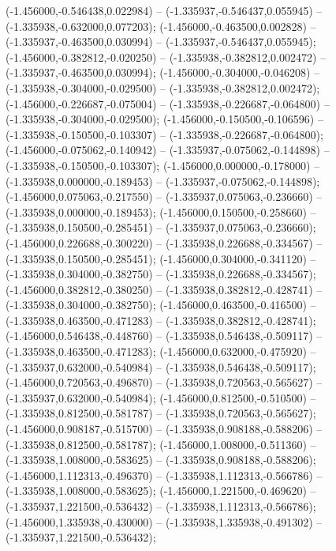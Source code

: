  (-1.456000,-0.546438,0.022984) -- (-1.335937,-0.546437,0.055945) -- (-1.335938,-0.632000,0.077203);
 (-1.456000,-0.463500,0.002828) -- (-1.335937,-0.463500,0.030994) -- (-1.335937,-0.546437,0.055945);
 (-1.456000,-0.382812,-0.020250) -- (-1.335938,-0.382812,0.002472) -- (-1.335937,-0.463500,0.030994);
 (-1.456000,-0.304000,-0.046208) -- (-1.335938,-0.304000,-0.029500) -- (-1.335938,-0.382812,0.002472);
 (-1.456000,-0.226687,-0.075004) -- (-1.335938,-0.226687,-0.064800) -- (-1.335938,-0.304000,-0.029500);
 (-1.456000,-0.150500,-0.106596) -- (-1.335938,-0.150500,-0.103307) -- (-1.335938,-0.226687,-0.064800);
 (-1.456000,-0.075062,-0.140942) -- (-1.335937,-0.075062,-0.144898) -- (-1.335938,-0.150500,-0.103307);
 (-1.456000,0.000000,-0.178000) -- (-1.335938,0.000000,-0.189453) -- (-1.335937,-0.075062,-0.144898);
 (-1.456000,0.075063,-0.217550) -- (-1.335937,0.075063,-0.236660) -- (-1.335938,0.000000,-0.189453);
 (-1.456000,0.150500,-0.258660) -- (-1.335938,0.150500,-0.285451) -- (-1.335937,0.075063,-0.236660);
 (-1.456000,0.226688,-0.300220) -- (-1.335938,0.226688,-0.334567) -- (-1.335938,0.150500,-0.285451);
 (-1.456000,0.304000,-0.341120) -- (-1.335938,0.304000,-0.382750) -- (-1.335938,0.226688,-0.334567);
 (-1.456000,0.382812,-0.380250) -- (-1.335938,0.382812,-0.428741) -- (-1.335938,0.304000,-0.382750);
 (-1.456000,0.463500,-0.416500) -- (-1.335938,0.463500,-0.471283) -- (-1.335938,0.382812,-0.428741);
 (-1.456000,0.546438,-0.448760) -- (-1.335938,0.546438,-0.509117) -- (-1.335938,0.463500,-0.471283);
 (-1.456000,0.632000,-0.475920) -- (-1.335937,0.632000,-0.540984) -- (-1.335938,0.546438,-0.509117);
 (-1.456000,0.720563,-0.496870) -- (-1.335938,0.720563,-0.565627) -- (-1.335937,0.632000,-0.540984);
 (-1.456000,0.812500,-0.510500) -- (-1.335938,0.812500,-0.581787) -- (-1.335938,0.720563,-0.565627);
 (-1.456000,0.908187,-0.515700) -- (-1.335938,0.908188,-0.588206) -- (-1.335938,0.812500,-0.581787);
 (-1.456000,1.008000,-0.511360) -- (-1.335938,1.008000,-0.583625) -- (-1.335938,0.908188,-0.588206);
 (-1.456000,1.112313,-0.496370) -- (-1.335938,1.112313,-0.566786) -- (-1.335938,1.008000,-0.583625);
 (-1.456000,1.221500,-0.469620) -- (-1.335937,1.221500,-0.536432) -- (-1.335938,1.112313,-0.566786);
 (-1.456000,1.335938,-0.430000) -- (-1.335938,1.335938,-0.491302) -- (-1.335937,1.221500,-0.536432);

